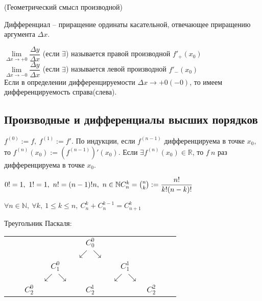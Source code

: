 \begin{multicols}{2}
\begin{theorema}{(Геометрический смысл производной)}{}
    \end{theorema}
    \begin{note}{}{} 
        Дифференциал -- приращение ординаты касательной, отвечающее приращению аргумента $\Delta x$.
    \end{note}
    \begin{definition}{}{} $\lim\limits_{\Delta x \to +0} \dfrac{\Delta y}{\Delta x}$ (если $\exists$) называется правой производной $f'_+(x_0)$
    \\$\lim\limits_{\Delta x \to -0} \dfrac{\Delta y}{\Delta x}$ (если $\exists$) называется левой производной $f'_-(x_0)$
    \\Если в определении дифференцируемости $\Delta x \to + 0 (-0)$, то имеем  дифференцируемость справа(слева).
    \end{definition}
    \subsection*{Производные и дифференциалы высших порядков}
    \begin{definition}{}{}
         $f^{(0)} := f,\ f^{(1)} := f'$. По индукции, если $f^{(n-1)}$ дифференцируема в точке $x_0$, то $f^{(n)} (x_0) := (f^{(n-1)})'(x_0)$. Если $\exists f^{(n)}(x_0) \in\mathbb R$, то $f\ n $ раз дифференцируема в точке $x_0$.
    \end{definition}
    \begin{definition}{}{} 
        $0! = 1,\ 1!  = 1,\ n! = (n-1)!n,\ n\in\mathbb N\\C_n^k = \binom{n}{k} := \dfrac{n!}{k!(n-k)!}$
    \end{definition}
    \begin{lemma}{}{}
         $\forall n \in\mathbb N,\ \forall k, \ 1 \leq k \leq n,\ C_n^k + C_n^{k-1} = C_{n+1}^k$
    \end{lemma}
    Треугольник Паскаля:
    \begin{center}
        \newcommand{\ap}{\ensuremath{\swarrow\,\searrow}}
        \setlength{\tabcolsep}{0pt}
        \begin{tabular}[h]{ccccccccc}
            &     &     &      & $C_0^0$   &      &      &     & \\
            &     &     &      & \ap &      &      &     & \\
            &     &     & $C_1^0$    &     &  $C_1^1$   &      &     & \\
            &     &     & \ap  &     &  \ap &      &     & \\
            &     & $C_2^0$   &      & $C_2^1$   &      & $C_2^2$    &     & \\

\end{tabular}
\end{center}
\end{multicols}
